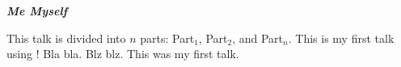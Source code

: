 \documentclass[landscape]{slides}
\begin{document}
 \vspace*{5cm}\centerline{{\large \bf \em Me Myself}}
	This talk is divided into $n$ parts: Part$_1$, Part$_2$, and Part$_n$.
	This is my first talk using {\ActiveDVI}!
	Bla bla.
	Blz blz.
	This was my first talk.
\end{document}

